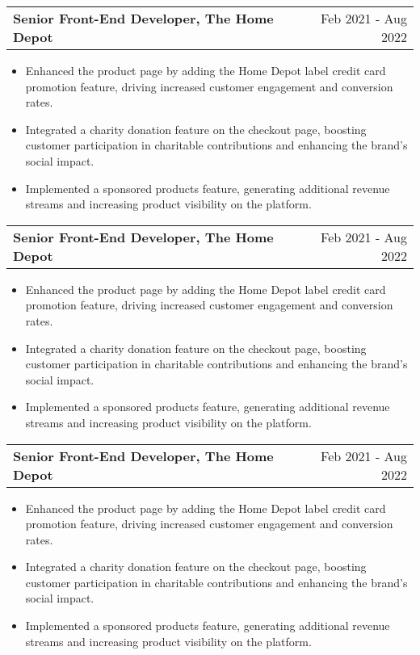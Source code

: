 \documentclass[a4paper,12pt]{article}
\makeatletter
\newenvironment{joblong}[2]
    {
    \begin{tabularx}{\linewidth}{@{}l X r@{}}
    \textbf{#1} & \hfill &  #2 \\[3.75pt]
    \end{tabularx}
    \begin{minipage}[t]{\linewidth}
    \begin{itemize}[nosep,after=\strut, leftmargin=1em, itemsep=3pt,label=--]
    }
    {
    \end{itemize}
    \end{minipage}    
    }
\makeatother
\begin{document}
\begin{joblong}{Senior Front-End Developer, The Home Depot}{Feb 2021 - Aug 2022}
\item Enhanced the product page by adding the Home Depot label credit card promotion feature, driving increased customer engagement and conversion rates.
\item Integrated a charity donation feature on the checkout page, boosting customer participation in charitable contributions and enhancing the brand's social impact. 
\item Implemented a sponsored products feature, generating additional revenue streams and increasing product visibility on the platform.\\

\end{joblong}

\begin{joblong}{Senior Front-End Developer, The Home Depot}{Feb 2021 - Aug 2022}
\item Enhanced the product page by adding the Home Depot label credit card promotion feature, driving increased customer engagement and conversion rates.
\item Integrated a charity donation feature on the checkout page, boosting customer participation in charitable contributions and enhancing the brand's social impact. 
\item Implemented a sponsored products feature, generating additional revenue streams and increasing product visibility on the platform.\\

\end{joblong}

\begin{joblong}{Senior Front-End Developer, The Home Depot}{Feb 2021 - Aug 2022}
\item Enhanced the product page by adding the Home Depot label credit card promotion feature, driving increased customer engagement and conversion rates.
\item Integrated a charity donation feature on the checkout page, boosting customer participation in charitable contributions and enhancing the brand's social impact. 
\item Implemented a sponsored products feature, generating additional revenue streams and increasing product visibility on the platform.\\

\end{joblong}
\end{document}
